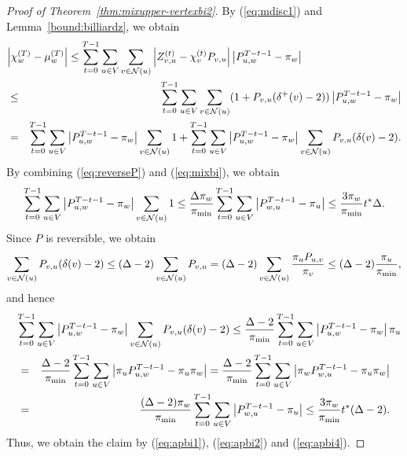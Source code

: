 \documentclass[letter, 11pt]{article}
\newcommand{\1}{\mbox{1}\hspace{-0.25em}\mbox{l}}
\begin{document}
\begin{proof}[Proof of Theorem~\ref{thm:mixupper-vertexbi2}]
By (\ref{eq:mdisc1}) and Lemma~\ref{bound:billiardz}, we obtain 
\begin{eqnarray}
\label{eq:apbi1}
\lefteqn{ \left| \chi ^{(T)}_w-\mu ^{(T)}_w\right| \leq  \sum_{t=0}^{T-1} \sum_{u\in V} \sum_{v\in {\cal N}(u)}\left| Z_{v, u}^{(t)}-\chi_v^{(t)}P_{v, u}\right|  \left| P^{T-t-1}_{u, w}-\pi_w \right| } \nonumber \\
&\leq & \sum_{t=0}^{T-1} \sum_{u\in V} \sum_{v\in {\cal N}(u)}(1+P_{v,u}(\delta^+(v)-2)) \left| P^{T-t-1}_{u, w}-\pi_w \right| \nonumber \\
&= & \sum_{t=0}^{T-1} \sum_{u\in V} \left| P^{T-t-1}_{u, w}-\pi_w \right| \sum_{v\in {\cal N}(u)}1 
+ \sum_{t=0}^{T-1} \sum_{u\in V} \left| P^{T-t-1}_{u, w}-\pi_w \right| \sum_{v\in {\cal N}(u)} P_{v,u}(\delta(v)-2). 
\end{eqnarray}
By combining (\ref{eq:reverseP}) and (\ref{eq:mixbi}), we obtain
\begin{eqnarray}
\label{eq:apbi2}
\sum_{t=0}^{T-1} \sum_{u\in V} \left| P^{T-t-1}_{u, w}-\pi_w \right| \sum_{v\in {\cal N}(u)}1 
\leq \frac{\Delta\pi_w}{\pi_{\min}} \sum_{t=0}^{T-1} \sum_{u\in V} \left| P^{T-t-1}_{w, u}-\pi_u \right|
\leq \frac{3\pi_w}{\pi_{\min}}t^*\Delta. 
\end{eqnarray}
Since $P$ is reversible, we obtain 
\begin{eqnarray}
\label{eq:apbi3}
\sum_{v\in {\cal N}(u)} P_{v,u}(\delta(v)-2) 
\leq (\Delta-2)\sum_{v\in {\cal N}(u)} P_{v,u}
=(\Delta-2)\sum_{v\in {\cal N}(u)} \frac{\pi_u P_{u,v}}{\pi_v}
\leq (\Delta-2) \frac{\pi_u}{\pi_{\min}}, 
\end{eqnarray}
and hence
\begin{eqnarray}
\label{eq:apbi4}
\lefteqn { \sum_{t=0}^{T-1} \sum_{u\in V} \left| P^{T-t-1}_{u, w}-\pi_w \right| \sum_{v\in {\cal N}(u)} P_{v,u}(\delta(v)-2)
\leq \frac{\Delta -2}{\pi_{\min}} \sum_{t=0}^{T-1} \sum_{u\in V} \left| P^{T-t-1}_{u, w}-\pi_w \right| \pi_u } \nonumber \\
&=& \frac{\Delta -2}{\pi_{\min}} \sum_{t=0}^{T-1} \sum_{u\in V} \left| \pi_u P^{T-t-1}_{u, w}-\pi_u\pi_w \right| 
= \frac{\Delta -2}{\pi_{\min}} \sum_{t=0}^{T-1} \sum_{u\in V} \left| \pi_w P^{T-t-1}_{w, u}-\pi_u\pi_w \right| \nonumber \\
&=&\frac{(\Delta -2)\pi_w}{\pi_{\min}} \sum_{t=0}^{T-1} \sum_{u\in V} \left| P^{T-t-1}_{w, u}-\pi_u \right| 
\leq \frac{3\pi_w}{\pi_{\min}}t^*(\Delta-2). 
\end{eqnarray}
Thus, we obtain the claim by (\ref{eq:apbi1}), (\ref{eq:apbi2}) and (\ref{eq:apbi4}). 
\end{proof}
\end{document}
